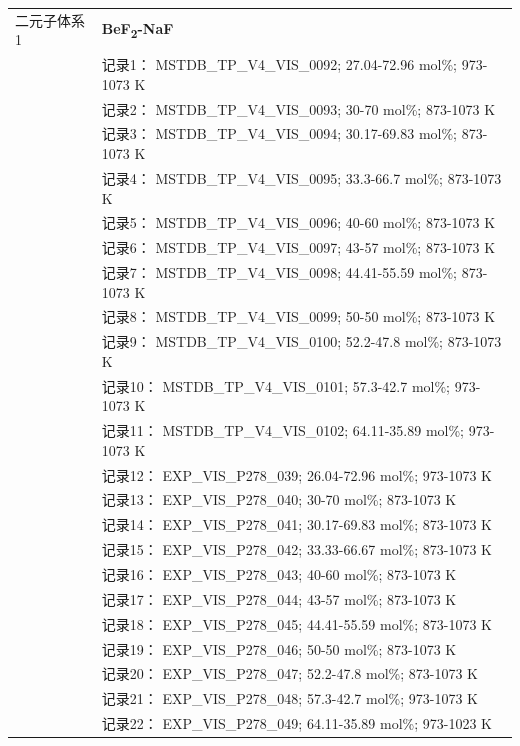 \documentclass[12pt]{article}
\begin{document}
{\begin{longtable}[]{@{}
  >{\raggedright\arraybackslash}p{}
  >{\raggedright\arraybackslash}p{}@{}}
二元子体系 1  & \textbf{BeF\textsubscript{2}-NaF} \\
 & 记录1： MSTDB\_TP\_V4\_VIS\_0092; 27.04-72.96 mol\%; 973-1073 K \\
 & 记录2： MSTDB\_TP\_V4\_VIS\_0093; 30-70 mol\%; 873-1073 K \\
 & 记录3： MSTDB\_TP\_V4\_VIS\_0094; 30.17-69.83 mol\%; 873-1073 K \\
 & 记录4： MSTDB\_TP\_V4\_VIS\_0095; 33.3-66.7 mol\%; 873-1073 K \\
 & 记录5： MSTDB\_TP\_V4\_VIS\_0096; 40-60 mol\%; 873-1073 K \\
 & 记录6： MSTDB\_TP\_V4\_VIS\_0097; 43-57 mol\%; 873-1073 K \\
 & 记录7： MSTDB\_TP\_V4\_VIS\_0098; 44.41-55.59 mol\%; 873-1073 K \\
 & 记录8： MSTDB\_TP\_V4\_VIS\_0099; 50-50 mol\%; 873-1073 K \\
 & 记录9： MSTDB\_TP\_V4\_VIS\_0100; 52.2-47.8 mol\%; 873-1073 K \\
 & 记录10： MSTDB\_TP\_V4\_VIS\_0101; 57.3-42.7 mol\%; 973-1073 K \\
 & 记录11： MSTDB\_TP\_V4\_VIS\_0102; 64.11-35.89 mol\%; 973-1073 K \\
 & 记录12： EXP\_VIS\_P278\_039; 26.04-72.96 mol\%; 973-1073 K \\
 & 记录13： EXP\_VIS\_P278\_040; 30-70 mol\%; 873-1073 K \\
 & 记录14： EXP\_VIS\_P278\_041; 30.17-69.83 mol\%; 873-1073 K \\
 & 记录15： EXP\_VIS\_P278\_042; 33.33-66.67 mol\%; 873-1073 K \\
 & 记录16： EXP\_VIS\_P278\_043; 40-60 mol\%; 873-1073 K \\
 & 记录17： EXP\_VIS\_P278\_044; 43-57 mol\%; 873-1073 K \\
 & 记录18： EXP\_VIS\_P278\_045; 44.41-55.59 mol\%; 873-1073 K \\
 & 记录19： EXP\_VIS\_P278\_046; 50-50 mol\%; 873-1073 K \\
 & 记录20： EXP\_VIS\_P278\_047; 52.2-47.8 mol\%; 873-1073 K \\
 & 记录21： EXP\_VIS\_P278\_048; 57.3-42.7 mol\%; 973-1073 K \\
 & 记录22： EXP\_VIS\_P278\_049; 64.11-35.89 mol\%; 973-1023 K  \\


\end{longtable}}
\end{document}
